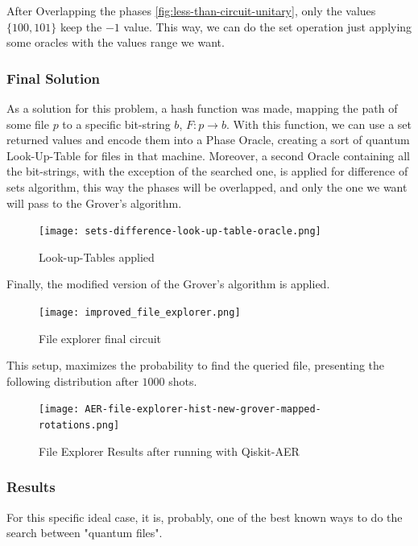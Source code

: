 \documentclass{article}
\begin{document}
After Overlapping the phases  \ref{fig:less-than-circuit-unitary}, only the values $\{100, 101\}$ keep the $-1$ value. This way, we can do the set operation just applying some oracles with the values range we want.

\subsubsection{Final Solution}


As a solution for this problem, a hash function was made, mapping the path of some file $p$ to a specific bit-string $b$, $F: p \to b$. With this function, we can use a set returned values and encode them into a Phase Oracle, creating a sort of quantum Look-Up-Table for files in that machine. Moreover, a second Oracle containing all the bit-strings, with the exception of the searched one, is applied for difference of sets algorithm, this way the phases will be overlapped, and only the one we want will pass to the Grover's algorithm.


\begin{figure}[h]
	\centering
	\texttt{[image: sets-difference-look-up-table-oracle.png]}
	\caption{Look-up-Tables applied}
	\label{fig:luts}
\end{figure}


Finally, the modified version of the Grover's algorithm is applied.

\begin{figure}[h]
	\centering
	\texttt{[image: improved\_file\_explorer.png]}
	\caption{File explorer final circuit}
	\label{fig:file-explorer}
\end{figure}

This setup, maximizes the probability to find the queried file, presenting the following distribution after $1000$ shots.

\begin{figure}[h]
	\centering
	\texttt{[image: AER-file-explorer-hist-new-grover-mapped-rotations.png]}
	\caption{ File Explorer Results after running with Qiskit-AER}
	\label{fig:file-explorer-hist}
\end{figure}


\subsubsection{Results}

For this specific ideal case, it is, probably, one of the best known ways to do the search between "quantum files".
\end{document}
